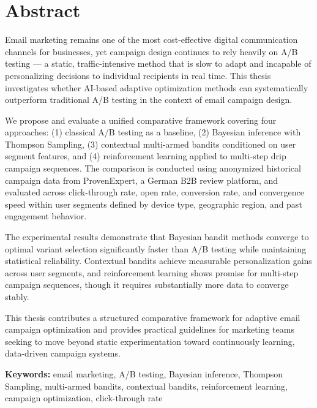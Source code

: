 \chapter*{Abstract}
\label{chap:abstract}

Email marketing remains one of the most cost-effective digital communication channels for businesses, yet campaign design continues to rely heavily on A/B testing --- a static, traffic-intensive method that is slow to adapt and incapable of personalizing decisions to individual recipients in real time. This thesis investigates whether AI-based adaptive optimization methods can systematically outperform traditional A/B testing in the context of email campaign design.

We propose and evaluate a unified comparative framework covering four approaches: (1) classical A/B testing as a baseline, (2) Bayesian inference with Thompson Sampling, (3) contextual multi-armed bandits conditioned on user segment features, and (4) reinforcement learning applied to multi-step drip campaign sequences. The comparison is conducted using anonymized historical campaign data from ProvenExpert, a German B2B review platform, and evaluated across click-through rate, open rate, conversion rate, and convergence speed within user segments defined by device type, geographic region, and past engagement behavior.

The experimental results demonstrate that Bayesian bandit methods converge to optimal variant selection significantly faster than A/B testing while maintaining statistical reliability. Contextual bandits achieve measurable personalization gains across user segments, and reinforcement learning shows promise for multi-step campaign sequences, though it requires substantially more data to converge stably.

This thesis contributes a structured comparative framework for adaptive email campaign optimization and provides practical guidelines for marketing teams seeking to move beyond static experimentation toward continuously learning, data-driven campaign systems.

\vspace{1.5cm}
\noindent\textbf{Keywords:} email marketing, A/B testing, Bayesian inference, Thompson Sampling, multi-armed bandits, contextual bandits, reinforcement learning, campaign optimization, click-through rate
